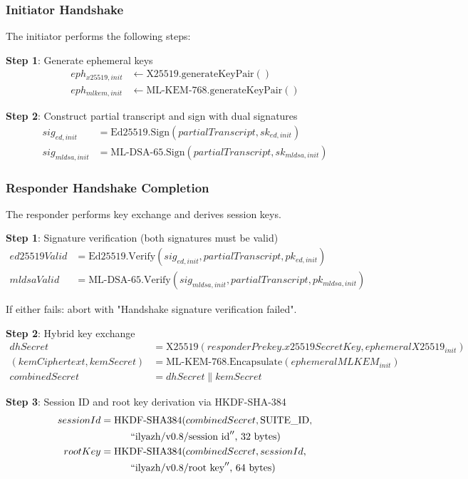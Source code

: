 \documentclass[11pt,a4paper,oneside]{article}
\begin{document}
\subsubsection{Initiator Handshake}

The initiator performs the following steps:

\textbf{Step 1}: Generate ephemeral keys
\begin{align*}
eph_{x25519,init} &\leftarrow \text{X25519.generateKeyPair}() \\
eph_{mlkem,init} &\leftarrow \text{ML-KEM-768.generateKeyPair}()
\end{align*}

\textbf{Step 2}: Construct partial transcript and sign with dual signatures
\begin{align*}
sig_{ed,init} &= \text{Ed25519.Sign}(partialTranscript, sk_{ed,init}) \\
sig_{mldsa,init} &= \text{ML-DSA-65.Sign}(partialTranscript, sk_{mldsa,init})
\end{align*}

\subsubsection{Responder Handshake Completion}

The responder performs key exchange and derives session keys.

\textbf{Step 1}: Signature verification (both signatures must be valid)
\begin{align*}
ed25519Valid &= \text{Ed25519.Verify}(sig_{ed,init}, partialTranscript, pk_{ed,init}) \\
mldsaValid &= \text{ML-DSA-65.Verify}(sig_{mldsa,init}, partialTranscript, pk_{mldsa,init})
\end{align*}

If either fails: abort with "Handshake signature verification failed".

\textbf{Step 2}: Hybrid key exchange
\begin{align*}
dhSecret &= \text{X25519}(responderPrekey.x25519SecretKey, ephemeralX25519_{init}) \\
(kemCiphertext, kemSecret) &= \text{ML-KEM-768.Encapsulate}(ephemeralMLKEM_{init}) \\
combinedSecret &= dhSecret \| kemSecret
\end{align*}

\textbf{Step 3}: Session ID and root key derivation via HKDF-SHA-384
\begin{align*}
sessionId &= \text{HKDF-SHA384}(combinedSecret, \text{SUITE\_ID}, \\
&\quad\quad\quad ``\text{ilyazh/v0.8/session id}''\text{, } 32\text{ bytes}) \\
rootKey &= \text{HKDF-SHA384}(combinedSecret, sessionId, \\
&\quad\quad\quad ``\text{ilyazh/v0.8/root key}''\text{, } 64\text{ bytes})
\end{align*}
\end{document}
